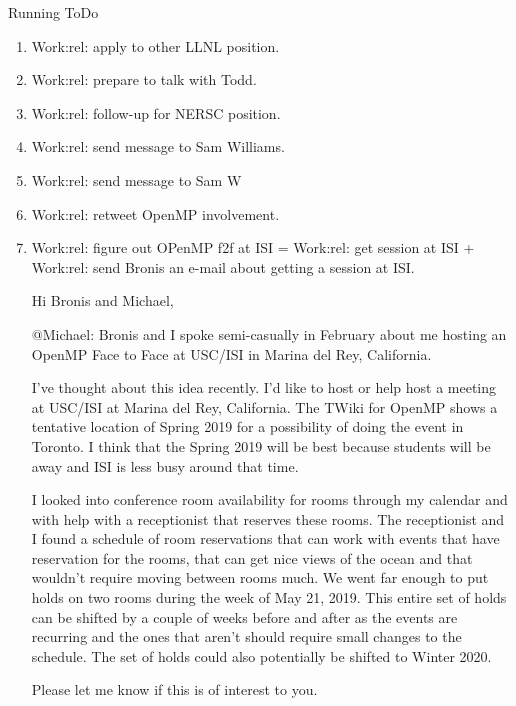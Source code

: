 \begin{columns}
\begin{column}{0.6\linewidth}
\begin{block}{Running ToDo}
\begin{enumerate}
      \item \tiny Work:rel: apply to other LLNL position.  \dl{} 

      \item \tiny Work:rel: prepare to talk with Todd. 

      \item \tiny Work:rel: follow-up for NERSC position. 
      \item \tiny Work:rel: send message to Sam Williams. 

      \item \tiny Work:rel: send message to Sam W

      \item \tiny Work:rel: retweet OpenMP involvement. 

      \item \tiny Work:rel: figure out OPenMP f2f at ISI = Work:rel:
        get session at ISI +  Work:rel: send Bronis an e-mail about
        getting a session at ISI.

        Hi Bronis and Michael,
        
        @Michael: Bronis and I spoke semi-casually in February about me hosting an OpenMP Face to Face at USC/ISI in Marina del Rey, California. 
        
        I’ve thought about this idea recently. I’d like to host or
        help host a meeting at USC/ISI at Marina del Rey,
        California. The TWiki for OpenMP shows a tentative location of
        Spring 2019 for a possibility of doing the event in Toronto. I
        think that the Spring 2019 will be best because students will
        be away and ISI is less busy around that time. 
        
        I looked into conference room availability for rooms through
        my calendar and with help with a receptionist that reserves
        these rooms. The receptionist and I found a schedule of room
        reservations that can work with events that have reservation
        for the rooms, that can get nice views of the ocean and that
        wouldn’t require moving between rooms much. We went far enough
        to put holds on two rooms during the week of May 21,
        2019. This entire set of holds can be shifted by a couple of
        weeks before and after as the events are recurring and the
        ones that aren’t should require small changes to the
        schedule. The set of holds could also potentially be shifted
        to Winter 2020. 

        Please let me know if this is of interest to you. 
        

\end{enumerate}
\end{block}
\end{column}
\end{columns}
